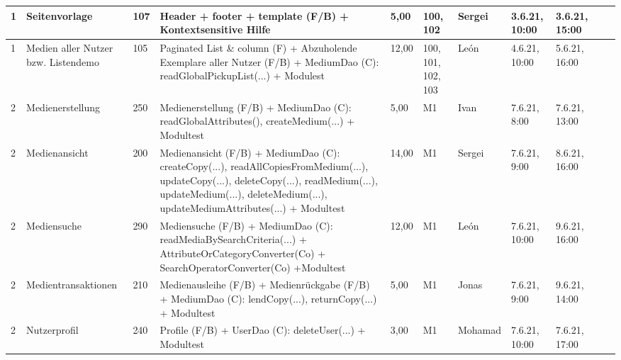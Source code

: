 \documentclass{article}
\begin{document}
\begin{table}[H]
\begin{tabular}{l l  l  l l  l  l l  l l  l}
1          & Seitenvorlage                       & 107 & Header + footer + template (F/B) + Kontextsensitive Hilfe                                                                                                                                                           & 5,00  & 100, 102           & Sergei     & 3.6.21, 10:00  & 3.6.21, 15:00  &                         \\ \hline
1         & Medien aller Nutzer bzw. Listendemo & 105 & Paginated List \& column (F) + Abzuholende Exemplare aller Nutzer (F/B) + MediumDao (C): readGlobalPickupList(...) + Modulest                                                                                           & 12,00 & 100, 101, 102, 103 & León       & 4.6.21, 10:00  & 5.6.21, 16:00  &                         \\ \hline
2         & Medienerstellung                    & 250 & Medienerstellung (F/B) + MediumDao (C): readGlobalAttributes(), createMedium(...) + Modultest                                                                                                                        & 5,00  & M1                 & Ivan       & 7.6.21, 8:00   & 7.6.21, 13:00  &                         \\ \hline
2         & Medienansicht                       & 200 & Medienansicht (F/B) + MediumDao (C): createCopy(...), readAllCopiesFromMedium(...), updateCopy(...), deleteCopy(...), readMedium(...), updateMedium(...), deleteMedium(...), updateMediumAttributes(...) + Modultest & 14,00 & M1                 & Sergei     & 7.6.21, 9:00   & 8.6.21, 16:00  &                         \\ \hline
2         & Mediensuche                         & 290 & Mediensuche (F/B) + MediumDao (C): readMediaBySearchCriteria(...) + AttributeOrCategoryConverter(Co) + SearchOperatorConverter(Co) +Modultest                                                                           & 12,00 & M1                 & León       & 7.6.21, 10:00  & 9.6.21, 16:00  &                         \\ \hline
2          & Medientransaktionen                 & 210 & Medienausleihe (F/B) + Medienrückgabe (F/B) + MediumDao (C): lendCopy(...), returnCopy(...) + Modultest                                                                                                                 & 5,00  & M1                 & Jonas      & 7.6.21, 9:00   & 9.6.21, 14:00  &                         \\ \hline
2          & Nutzerprofil                        & 240 & Profile (F/B) + UserDao (C): deleteUser(...) + Modultest                                                                                                                                                             & 3,00  & M1                 & Mohamad    & 7.6.21, 10:00  & 7.6.21, 17:00  &                         \\ \hline

\end{tabular}
\end{table}
\end{document}

